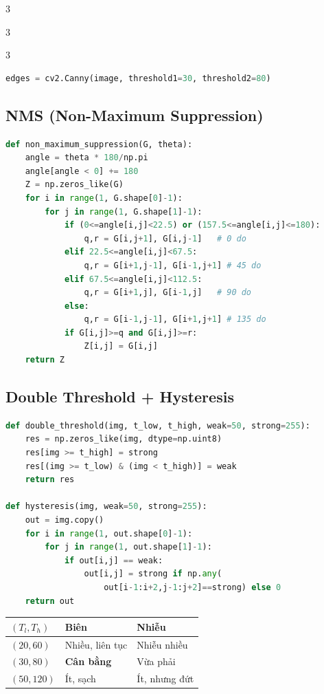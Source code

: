 \documentclass[9pt,landscape,a4paper]{extarticle}
\begin{document}
\begin{multicols*}{3}
\begin{multicols*}{3}
\begin{multicols}{3}
\begin{lstlisting}[language=Python]
edges = cv2.Canny(image, threshold1=30, threshold2=80)
\end{lstlisting}

\subsection{NMS (Non-Maximum Suppression)}
\begin{lstlisting}[language=Python]
def non_maximum_suppression(G, theta):
    angle = theta * 180/np.pi
    angle[angle < 0] += 180
    Z = np.zeros_like(G)
    for i in range(1, G.shape[0]-1):
        for j in range(1, G.shape[1]-1):
            if (0<=angle[i,j]<22.5) or (157.5<=angle[i,j]<=180):
                q,r = G[i,j+1], G[i,j-1]   # 0 do
            elif 22.5<=angle[i,j]<67.5:
                q,r = G[i+1,j-1], G[i-1,j+1] # 45 do
            elif 67.5<=angle[i,j]<112.5:
                q,r = G[i+1,j], G[i-1,j]   # 90 do
            else:
                q,r = G[i-1,j-1], G[i+1,j+1] # 135 do
            if G[i,j]>=q and G[i,j]>=r:
                Z[i,j] = G[i,j]
    return Z
\end{lstlisting}

\subsection{Double Threshold + Hysteresis}
\begin{lstlisting}[language=Python]
def double_threshold(img, t_low, t_high, weak=50, strong=255):
    res = np.zeros_like(img, dtype=np.uint8)
    res[img >= t_high] = strong
    res[(img >= t_low) & (img < t_high)] = weak
    return res

def hysteresis(img, weak=50, strong=255):
    out = img.copy()
    for i in range(1, out.shape[0]-1):
        for j in range(1, out.shape[1]-1):
            if out[i,j] == weak:
                out[i,j] = strong if np.any(
                    out[i-1:i+2,j-1:j+2]==strong) else 0
    return out
\end{lstlisting}

\begin{center}\small
\begin{tabular}{@{}lll@{}}
\toprule
$(T_l, T_h)$ & Biên & Nhiễu \\
\midrule
$(20, 60)$ & Nhiều, liên tục & Nhiễu nhiều \\
$(30, 80)$ & \textbf{Cân bằng} & Vừa phải \\
$(50,120)$ & Ít, sạch & Ít, nhưng đứt \\
\bottomrule
\end{tabular}
\end{center}


\end{multicols}
\end{multicols*}
\end{multicols*}
\end{document}
